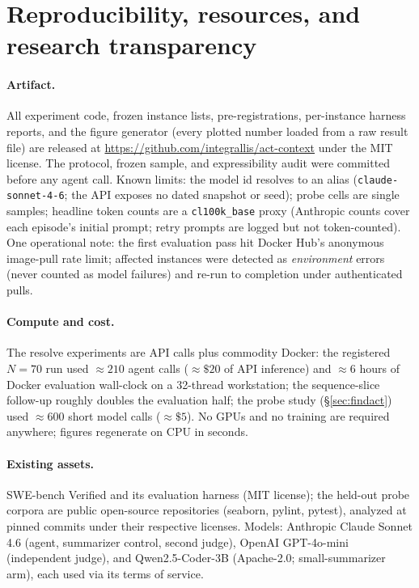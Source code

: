 \documentclass{article}
\begin{document}
\section{Reproducibility, resources, and research transparency}
\label{app:repro}

\paragraph{Artifact.} All experiment code, frozen instance lists, pre-registrations, per-instance
harness reports, and the figure generator (every plotted number loaded from a raw result file) are
released at \url{https://github.com/integrallis/act-context} under the MIT license.
The protocol, frozen sample, and expressibility audit were committed before any agent call. Known
limits: the model id resolves to an alias (\texttt{claude-sonnet-4-6}; the API exposes no dated
snapshot or seed); probe cells are single samples; headline token counts are a
\texttt{cl100k\_base} proxy (Anthropic counts cover each episode's initial prompt; retry prompts
are logged but not token-counted). One operational note: the first
evaluation pass hit Docker Hub's anonymous image-pull rate limit; affected instances were detected
as \emph{environment} errors (never counted as model failures) and re-run to completion under
authenticated pulls.

\paragraph{Compute and cost.} The resolve experiments are API calls plus commodity Docker: the
registered $N{=}70$ run used ${\approx}210$ agent calls (${\approx}\$20$ of API inference) and
${\approx}6$ hours of Docker evaluation wall-clock on a 32-thread workstation; the sequence-slice
follow-up roughly doubles the evaluation half; the probe study (\S\ref{sec:findact}) used
${\approx}600$ short model calls (${\approx}\$5$). No GPUs and no training are required anywhere;
figures regenerate on CPU in seconds.

\paragraph{Existing assets.} SWE-bench Verified and its evaluation harness \citep{swebench} (MIT
license); the held-out probe corpora are public open-source repositories (seaborn, pylint,
pytest), analyzed at pinned commits under their respective licenses. Models: Anthropic Claude
Sonnet 4.6 (agent, summarizer control, second judge), OpenAI GPT-4o-mini (independent judge), and
Qwen2.5-Coder-3B (Apache-2.0; small-summarizer arm), each used via its terms of service.
\end{document}
